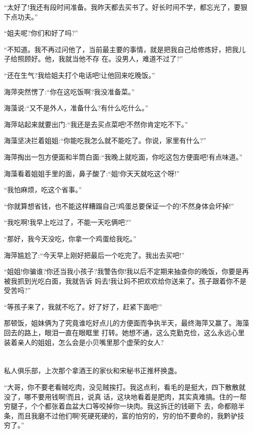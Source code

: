 \documentclass[11pt,a4paper,onecolumn]{article}
\begin{document}
``太好了!我还有段时间准备。我昨天都去买书了。好长时间不学，都忘光了，要狠下点功夫。''

``姐夫呢?你们和好了吗?''

``不知道。我不再过问他了，当前最主要的事情，就是把我自己给修炼好，把我儿子给照顾好。他，我就当他不存
在。没男人，难道不过了?''

``还在生气?我给姐夫打个电话吧!让他回来吃晚饭。''

海萍突然愣了:``你在这吃饭啊?我没准备菜。''

海藻说:``又不是外人，准备什么?有什么吃什么。''

海萍站起来就要出门:``我还是去买点菜吧!不然你肯定吃不下。''

海藻坚决拦着姐姐:``你能吃我怎么就不能吃了。你说，家里有什么?''

海萍掏出一包方便面和半筒白面:``我晚上就吃面，你吃这包方便面吧!有点味道。''

海藻看着姐姐手里的面，鼻子酸了:``姐!你天天就吃这个呀!''

``我怕麻烦，吃这个省事。''

``你就算想省钱，也不能这样糟蹋自己!鸡蛋总要保证一个的!不然身体会坏掉!''

``我吃啊!我早上吃过了，不能一天吃俩吧?''

``那好，我今天没吃，你拿一个鸡蛋给我吃。''

海萍尴尬了:``今天早上刚好把最后一个吃完了。我出去买吧!''

``姐姐!你骗谁?你还当我小孩子?我警告你!我以后不定期来抽查你的晚饭，你要是再被我抓到光吃白面，我就告诉
妈去!我让妈不把欢欢给你送来了。孩子跟着你不是受苦吗?''

``等孩子来了，我就不吃了。好了好了，赶紧下面吧!''

那顿饭，姐妹俩为了究竟谁吃好点儿的方便面而争执半天，最终海萍又赢了。海藻回去的路上，眼泪一直在眼眶里
打转。她想不通，这么克勤克俭，这么永远心里装着亲人的姐姐，怎么会是小贝嘴里那个虚荣的女人?

\section[\thesection]{}

私人俱乐部，上次那个拿酒王的家伙和宋秘书正推杯换盏。

``大哥，你不要老看贼吃肉，没见贼挨打。我这点利，看毛的是挺大，四下散散就没了，哪不要用钱啊!而且，说真
话，这块地看着是肥肉，其实真难搞。住的一帮穷腿子，个个都张着血盆大口等咬掉你一块肉。我这拆迁的钱砸下
去，命都赔半条，而且我磨不过他们啊!死硬死硬的，富的怕穷的，穷的怕不要命的，我黔驴技穷了。''
\end{document}
